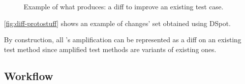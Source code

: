 \begin{figure}[h]
	\centering{}
	\caption{Example of what \dspot produces: a diff to improve an existing test case.}
	\label{fig:diff-protostuff}
\end{figure}

\autoref{fig:diff-protostuff} shows an example of changes' set obtained using DSpot.

By construction, all \dspot's amplification can be represented as a diff on an existing test method since amplified test methods are variants of existing ones.

\subsection{Workflow}
\label{subsec:dspot:overview:workflow}

